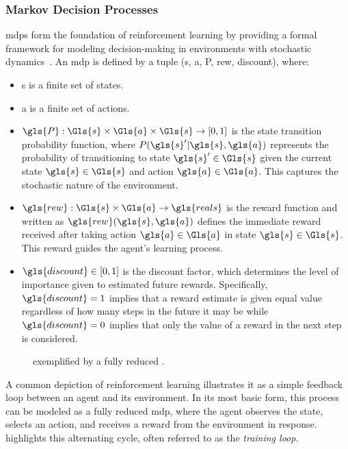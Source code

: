 \subsubsection{Markov Decision Processes}
\Glspl{mdp} form the foundation of reinforcement learning by providing 
a formal framework for modeling decision-making in environments with 
stochastic dynamics~\cite{puterman2005}. An \gls{mdp} is defined by a tuple 
(\Gls{s}, \Gls{a}, \gls{P}, \gls{rew}, \gls{discount}), where:
\begin{itemize}
    \item \Gls{s} is a finite set of states.
    \item \Gls{a} is a finite set of actions.
    \item \(\gls{P}: \Gls{s} \times \Gls{a} \times \Gls{s} \rightarrow [0,1]\) is the state 
        transition probability function, where \(P(\gls{s}^\prime|\gls{s}, \gls{a})\) 
        represents the probability of transitioning to state \(\gls{s}^\prime\in \Gls{s}\)
        given the current state \(\gls{s}\in \Gls{s}\) and action \(\gls{a}\in \Gls{a}\).
        This captures the stochastic nature of the environment.
    \item \(\gls{rew}: \Gls{s} \times \Gls{a} \rightarrow \gls{reals}\) is the reward 
        function and written as \(\gls{rew}(\gls{s}, \gls{a})\) defines the immediate reward 
        received after taking action \(\gls{a}\in \Gls{a}\) in state \(\gls{s}\in \Gls{s}\). 
        This reward guides the agent's learning process.
    \item \(\gls{discount} \in [0, 1]\) is the discount factor, which 
        determines the level of importance given to estimated future rewards. 
        Specifically, \(\gls{discount}=1\) implies that a reward estimate is 
        given equal value regardless of how many steps in the future it may 
        be while \(\gls{discount}=0\) implies that only the value of a 
        reward in the next step is considered.
\end{itemize}

\begin{figure}
    \centering
    
    \caption{ exemplified by a 
        fully reduced .}
    \label{fig:mdp_cycle}
\end{figure}

A common depiction of reinforcement learning illustrates it as a simple 
feedback loop between an agent and its environment. In its most basic form, 
this process can be modeled as a fully reduced \gls{mdp}, where the agent observes
the state, selects an action, and receives a reward from the environment in response. 
 highlights this alternating cycle, often referred to as the 
\emph{training loop}.

